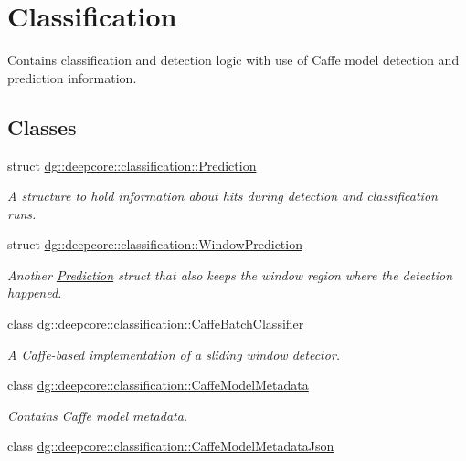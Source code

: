 \hypertarget{group___classification_module}{}\section{Classification}
\label{group___classification_module}


Contains classification and detection logic with use of Caffe model detection and prediction information.  


\subsection*{Classes}
\begin{DoxyCompactItemize}
\item 
struct \hyperlink{structdg_1_1deepcore_1_1classification_1_1_prediction}{dg\+::deepcore\+::classification\+::\+Prediction}
\begin{DoxyCompactList}\small\item\em A structure to hold information about hits during detection and classification runs. \end{DoxyCompactList}\item 
struct \hyperlink{structdg_1_1deepcore_1_1classification_1_1_window_prediction}{dg\+::deepcore\+::classification\+::\+Window\+Prediction}
\begin{DoxyCompactList}\small\item\em Another \hyperlink{structdg_1_1deepcore_1_1classification_1_1_prediction}{Prediction} struct that also keeps the window region where the detection happened. \end{DoxyCompactList}\item 
class \hyperlink{classdg_1_1deepcore_1_1classification_1_1_caffe_batch_classifier}{dg\+::deepcore\+::classification\+::\+Caffe\+Batch\+Classifier}
\begin{DoxyCompactList}\small\item\em A Caffe-\/based implementation of a sliding window detector. \end{DoxyCompactList}\item 
class \hyperlink{structdg_1_1deepcore_1_1classification_1_1_caffe_model_metadata}{dg\+::deepcore\+::classification\+::\+Caffe\+Model\+Metadata}
\begin{DoxyCompactList}\small\item\em Contains Caffe model metadata. \end{DoxyCompactList}\item 
class \hyperlink{classdg_1_1deepcore_1_1classification_1_1_caffe_model_metadata_json}{dg\+::deepcore\+::classification\+::\+Caffe\+Model\+Metadata\+Json}

\end{DoxyCompactItemize}
